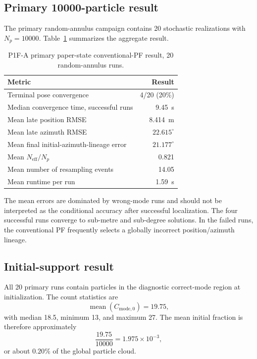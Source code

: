 \subsection{Primary 10000-particle result}
The primary random-annulus campaign contains 20 stochastic realizations with $N_p=10000$. Table~\ref{tab:p1fa_core} summarizes the aggregate result.
\begin{table}[ht]
\centering
\caption{P1F-A primary paper-state conventional-PF result, 20 random-annulus runs.}
\label{tab:p1fa_core}
\begin{tabular}{lr}
\toprule
Metric & Result\\
\midrule
Terminal pose convergence & 4/20 (20\%)\\
Median convergence time, successful runs & \SI{9.45}{s}\\
Mean late position RMSE & \SI{8.414}{m}\\
Mean late azimuth RMSE & $22.615^\circ$\\
Mean final initial-azimuth-lineage error & $21.177^\circ$\\
Mean $N_{\mathrm{eff}}/N_p$ & 0.821\\
Mean number of resampling events & 14.05\\
Mean runtime per run & \SI{1.59}{s}\\
\bottomrule
\end{tabular}
\end{table}

The mean errors are dominated by wrong-mode runs and should not be interpreted as the conditional accuracy after successful localization. The four successful runs converge to sub-metre and sub-degree solutions. In the failed runs, the conventional PF frequently selects a globally incorrect position/azimuth lineage.

\subsection{Initial-support result}
All 20 primary runs contain particles in the diagnostic correct-mode region at initialization. The count statistics are
\begin{equation}
    \operatorname{mean}(C_{\mathrm{mode},0})=19.75,
\end{equation}
with median 18.5, minimum 13, and maximum 27. The mean initial fraction is therefore approximately
\begin{equation}
    \frac{19.75}{10000}=1.975\times10^{-3},
\end{equation}
or about $0.20\%$ of the global particle cloud.

